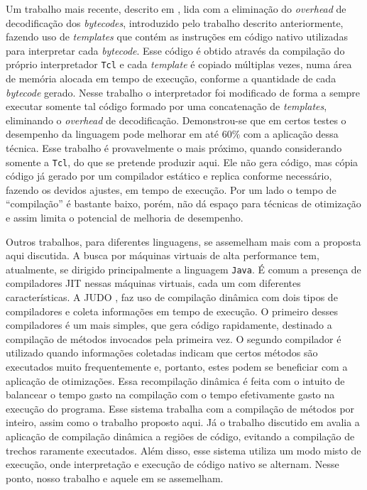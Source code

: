 Um trabalho mais recente, descrito em \cite{vitale_catenation}, lida
com a eliminação do \textit{overhead} de decodificação dos
\textit{bytecodes}, introduzido pelo trabalho descrito anteriormente,
fazendo uso de \textit{templates} que contém as instruções em
código nativo utilizadas para interpretar cada \textit{bytecode}.
Esse código é obtido através da compilação do próprio interpretador
\texttt{Tcl} e cada \textit{template} é copiado múltiplas vezes,
numa área de memória alocada em tempo de execução, conforme a quantidade de
cada \textit{bytecode} gerado. Nesse trabalho o interpretador foi
modificado de forma a sempre executar somente tal código formado por
uma concatenação de \textit{templates}, eliminando o \textit{overhead} de
decodificação. Demonstrou-se que em certos testes o desempenho da
linguagem pode melhorar em até 60\% com a aplicação dessa técnica.
Esse trabalho é provavelmente o mais próximo, quando considerando
somente a \texttt{Tcl}, do que se pretende produzir aqui.
Ele não gera código, mas cópia código já gerado por um compilador
estático e replica conforme necessário, fazendo os devidos
ajustes, em tempo de execução. Por um lado o tempo de ``compilação'' é
bastante baixo, porém, não dá espaço para técnicas de otimização e assim
limita o potencial de melhoria de desempenho.

Outros trabalhos, para diferentes linguagens, se assemelham mais com a
proposta aqui discutida. A busca por máquinas virtuais de alta
performance tem, atualmente, se dirigido principalmente a linguagem
\texttt{Java}. É comum a presença de compiladores JIT nessas máquinas
virtuais, cada um com diferentes características. A JUDO \cite{judo}, faz uso
de compilação dinâmica com dois tipos de compiladores e coleta
informações em tempo de execução. O primeiro desses compiladores é um
mais simples, que gera código rapidamente, destinado a compilação
de métodos invocados pela primeira vez. O segundo compilador é
utilizado quando informações coletadas indicam que certos métodos
são executados muito frequentemente e, portanto, estes podem se
beneficiar com a aplicação de otimizações. Essa recompilação dinâmica
é feita com o intuito de balancear o tempo gasto na compilação com o tempo
efetivamente gasto na execução do programa. Esse sistema trabalha com
a compilação de métodos por inteiro, assim como o trabalho proposto
aqui. Já o trabalho discutido em \cite{suganuma_pldi_2003} avalia a
aplicação de compilação dinâmica a regiões de código, evitando
a compilação de trechos raramente executados. Além disso, esse sistema
utiliza um modo misto de execução, onde interpretação e execução de
código nativo se alternam. Nesse ponto, nosso trabalho e aquele em
\cite{suganuma_pldi_2003} se assemelham.

